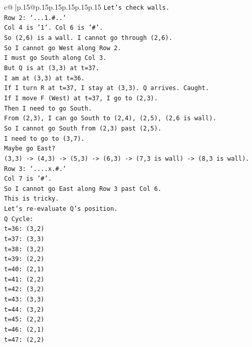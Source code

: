 \documentclass{article}
\begin{document}
{\begin{supertabular}{c@{$\;$}|p{.15\linewidth}@{}p{.15\linewidth}p{.15\linewidth}p{.15\linewidth}p{.15\linewidth}p{.15\linewidth}}
{{{\texttt{Let's check walls.} \\
\texttt{Row 2: `...1.\#..`} \\
\texttt{Col 4 is '1'. Col 6 is '\#'.} \\
\texttt{So (2,6) is a wall. I cannot go through (2,6).} \\
\texttt{So I cannot go West along Row 2.} \\
\texttt{I must go South along Col 3.} \\
\texttt{But Q is at (3,3) at t=37.} \\
\texttt{I am at (3,3) at t=36.} \\
\texttt{If I turn R at t=37, I stay at (3,3). Q arrives. Caught.} \\
\texttt{If I move F (West) at t=37, I go to (2,3).} \\
\texttt{Then I need to go South.} \\
\texttt{From (2,3), I can go South to (2,4), (2,5), (2,6 is wall).} \\
\texttt{So I cannot go South from (2,3) past (2,5).} \\
\texttt{I need to go to (3,7).} \\
\texttt{Maybe go East?} \\
\texttt{(3,3) {-}> (4,3) {-}> (5,3) {-}> (6,3) {-}> (7,3 is wall) {-}> (8,3 is wall).} \\
\texttt{Row 3: `....x.\#.`} \\
\texttt{Col 7 is '\#'.} \\
\texttt{So I cannot go East along Row 3 past Col 6.} \\
\texttt{This is tricky.} \\
\texttt{Let's re{-}evaluate Q's position.} \\
\texttt{Q Cycle:} \\
\texttt{t=36: (3,2)} \\
\texttt{t=37: (3,3)} \\
\texttt{t=38: (3,2)} \\
\texttt{t=39: (2,2)} \\
\texttt{t=40: (2,1)} \\
\texttt{t=41: (2,2)} \\
\texttt{t=42: (3,2)} \\
\texttt{t=43: (3,3)} \\
\texttt{t=44: (3,2)} \\
\texttt{t=45: (2,2)} \\
\texttt{t=46: (2,1)} \\
\texttt{t=47: (2,2)} \\
}}}
\end{supertabular}}
\end{document}
